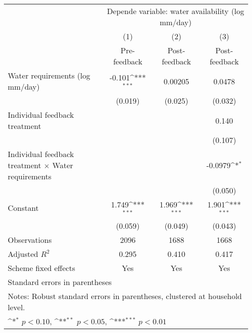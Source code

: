 {
\def\sym#1{\ifmmode^{#1}\else\(^{#1}\)\fi}
\begin{tabular}{l*{3}{c}}
\hline\hline
                    &\multicolumn{3}{c}{Depende variable: water availability (log mm/day)}\\\cmidrule(lr){2-4}
                    &\multicolumn{1}{c}{(1)}&\multicolumn{1}{c}{(2)}&\multicolumn{1}{c}{(3)}\\
                    &\multicolumn{1}{c}{Pre-feedback}&\multicolumn{1}{c}{Post-feedback}&\multicolumn{1}{c}{Post-feedback}\\
\hline
Water requirements (log mm/day)&      -0.101\sym{***}&     0.00205         &      0.0478         \\
                    &     (0.019)         &     (0.025)         &     (0.032)         \\
[1em]
Individual feedback treatment&                     &                     &       0.140         \\
                    &                     &                     &     (0.107)         \\
[1em]
Individual feedback treatment $\times$ Water requirements&                     &                     &     -0.0979\sym{*}  \\
                    &                     &                     &     (0.050)         \\
[1em]
Constant            &       1.749\sym{***}&       1.969\sym{***}&       1.901\sym{***}\\
                    &     (0.059)         &     (0.049)         &     (0.043)         \\
\hline
Observations        &        2096         &        1688         &        1668         \\
Adjusted \(R^{2}\)  &       0.295         &       0.410         &       0.417         \\
Scheme fixed effects&         Yes         &         Yes         &         Yes         \\
\hline\hline
\multicolumn{4}{l}{\footnotesize Standard errors in parentheses}\\
\multicolumn{4}{l}{\footnotesize Notes: Robust standard errors in parentheses, clustered at household level.}\\
\multicolumn{4}{l}{\footnotesize \sym{*} \(p<0.10\), \sym{**} \(p<0.05\), \sym{***} \(p<0.01\)}\\
\end{tabular}
}
